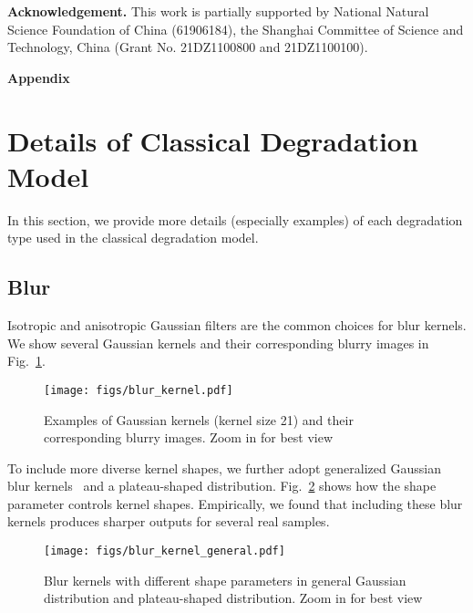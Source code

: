 \documentclass[10pt,twocolumn,letterpaper]{article}
\begin{document}
\noindent\textbf{Acknowledgement.} This work is partially supported by National Natural Science Foundation of China (61906184), the Shanghai Committee of Science and Technology, China (Grant No. 21DZ1100800 and 21DZ1100100).



{\small


}

\clearpage
\appendix


\noindent\textbf{\large{Appendix}} \label{appendix}

\section{Details of Classical Degradation Model} \label{sec:more_detail_degradation_model}

In this section, we provide more details (especially examples) of each degradation type used in the classical degradation model.

\subsection{Blur}
Isotropic and anisotropic Gaussian filters are the common choices for blur kernels. We show several Gaussian kernels and their corresponding blurry images in Fig.~\ref{fig:blur_kernel}.
\begin{figure}[h]
\begin{center}
\texttt{[image: figs/blur\_kernel.pdf]}
	\end{center}
	\vspace{-0.5cm}
	\caption{Examples of Gaussian kernels (kernel size 21) and their corresponding blurry images. Zoom in for best view}
	\label{fig:blur_kernel}
\end{figure}

To include more diverse kernel shapes, we further adopt generalized Gaussian blur kernels~\cite{liu2020estimating} and a plateau-shaped distribution.
Fig.~\ref{fig:blur_kernel_general} shows how the shape parameter  controls kernel shapes.
Empirically, we found that including these blur kernels produces sharper outputs for several real samples.

\begin{figure}[h]
\begin{center}
\texttt{[image: figs/blur\_kernel\_general.pdf]}
	\end{center}
	\vspace{-0.5cm}
	\caption{Blur kernels with different shape parameters in general Gaussian distribution and plateau-shaped distribution. Zoom in for best view}
	\label{fig:blur_kernel_general}
\end{figure}
\end{document}

